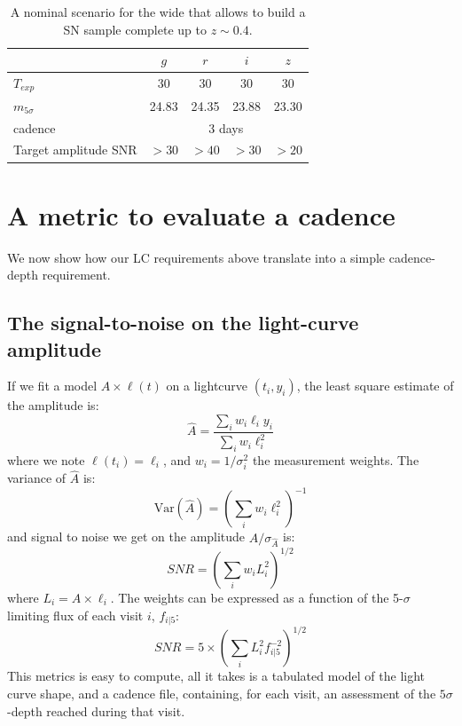 \documentclass[\docopts]{\docclass}
\begin{document}
\begin{table}
\begin{center}
\caption{A nominal scenario for the wide that allows to build a SN
  sample complete up to $z \sim 0.4$.}
\label{tab:nominal_scenario_DDF}
\begin{tabular}{l|cccc}
\hline
\hline
              & $g$ & $r$ & $i$ & $z$ \\
\hline 
$T_{exp}$      & 30       &   30    &  30        & 30       \\
$m_{5\sigma}$  &  24.83   &  24.35   &  23.88    &  23.30   \\
cadence       &  \multicolumn{4}{c}{3 days} \\
Target amplitude SNR & $>30$ & $>40$ & $>30$ & $>20$ \\
\hline
\end{tabular}
\end{center}
\end{table}






\section{A metric to evaluate a cadence}
\label{sec:metric}

We now show how our LC requirements above translate into a simple
cadence-depth requirement.


\subsection{The signal-to-noise on the light-curve amplitude}

If we fit a model $A \times \ell(t)$ on a lightcurve $(t_i, y_i)$, the
least square estimate of the amplitude is:
\begin{equation}
  \hat{A} = \frac{\sum_i w_i \ell_i y_i}{\sum_i w_i \ell^2_i}
\end{equation}
where we note $\ell(t_i) = \ell_i$, and $w_i = 1 / \sigma_i^2$ the
measurement weights. The variance of $\hat{A}$ is:
\begin{equation}
  \mathrm{Var}(\hat{A}) = \left(\sum_i w_i \ell^2_i\right)^{-1}
\end{equation}
and signal to noise we get on the amplitude $\hat{A} /
\sigma_{\hat{A}}$ is:
\begin{equation}
  SNR = \left(\sum_i w_i L^2_i\right)^{1/2}
\end{equation}
where $L_i = A \times \ell_i$.  The weights can be expressed as a
function of the 5-$\sigma$ limiting flux of each visit $i$, $f_{i|5}$:
\begin{equation}
  SNR = 5 \times \left(\sum_i L^2_i f^{-2}_{i|5}\right)^{1/2}
  \label{eqn:snr}
\end{equation}
This metrics is easy to compute, all it takes is a tabulated model of
the light curve shape, and a cadence file, containing, for each visit,
an assessment of the $5\sigma$-depth reached during that visit. 
\end{document}
